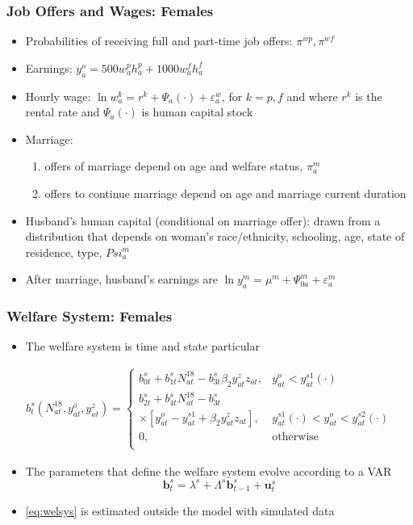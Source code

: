 \begin{frame}
	\frametitle{Job Offers and Wages: Females}
	\begin{itemize}
		\item Probabilities of receiving full and part-time job offers: $\pi^{wp}, \pi^{wf}$
		\item Earnings: $y_{a}^o = 500w_{a}^ph_{a}^p + 1000w_{a}^fh_{a}^f $
		\item Hourly wage: $\ln w_{a}^k = r^k + \Psi_{a}(\cdot) + \varepsilon_{a}^{w}$, for $k = p,f$ and where $r^k$ is the rental rate and $\Psi_{a}(\cdot)$ is human capital stock
		\item Marriage: 
			\begin{enumerate}
			\item offers of marriage depend on age and welfare status, $\pi_{a}^m$
			\item offers to continue marriage depend on age and marriage current duration
			\end{enumerate}
		\item Husband's human capital (conditional on marriage offer): drawn from a distribution that depends on woman's race/ethnicity, schooling, age, state of residence, type, $Psi_{a}^m$
		\item After marriage, husband's earnings are $\ln y_{a}^m = \mu^m + \Psi_{0a}^m + \varepsilon_{a}^m$ 					
		\end{itemize}
\end{frame}

\begin{frame}
	\frametitle{Welfare System: Females}
	\begin{itemize}
		\item The welfare system is time and state particular
	\end{itemize}
	\begin{eqnarray}
b_{t}^s \left( N_{at}^{18}, y_{at}^o, y_{at}^z \right) =
\begin{cases}
b_{0t}^s + b_{1t}^s N_{at}^{18} - b_{3t}^s \beta_{2} y_{at}^z z_{at}, & y_{at}^o < y_{at}^{s1}(\cdot) \nonumber \\
b_{2t}^s + b_{4t}^s N_{at}^{18} - b_{3t}^s & \nonumber \\
\times \left[ y_{at}^o - y_{at}^{s1} + \beta_{2} y_{at}^z z_{at} \right] , & y_{at}^{s1}(\cdot) < y_{at}^o < y_{at}^{s2}(\cdot) \nonumber \\
0, & \text{otherwise} \nonumber \\
\end{cases}
	\end{eqnarray}
	\begin{itemize}
	\item The parameters that define the welfare system evolve according to a VAR
		\begin{equation}
		\mathbf{b}_{t}^s = \lambda^s + \Lambda^s \mathbf{b}_{t-1}^s + \mathbf{u}_{t}^s \label{eq:welsys}
		\end{equation}
	 \item \eqref{eq:welsys} is estimated outside the model with simulated data
	\end{itemize}
\end{frame}


